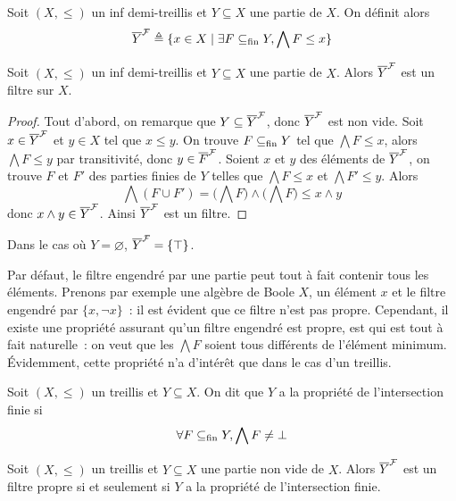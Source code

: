 \begin{definition}
  Soit $(X,\leq)$ un inf demi-treillis et $Y\subseteq X$ une partie de $X$. On 
  définit alors
  \[\overline{Y}^{\mathcal F} \triangleq \{x\in X \mid \exists F\subseteq_{\mathrm{fin}} Y, \bigwedge F \leq x\}\]
\end{definition}

\begin{proposition}
  Soit $(X,\leq)$ un inf demi-treillis et $Y\subseteq X$ une partie de $X$.
  Alors $\overline{Y}^{\mathcal F}$ est un filtre sur $X$.
\end{proposition}

\begin{proof}
  Tout d'abord, on remarque que $Y\subseteq \overline{Y}^{\mathcal F}$, donc $\overline{Y}^{\mathcal F}$ est
  non vide. Soit $x\in \overline{Y}^{\mathcal F}$ et $y\in X$ tel que $x\leq y$. On trouve
  $F\subseteq_{\mathrm{fin}} Y$ tel que $\bigwedge F\leq x$, alors $\bigwedge F \leq y$ par
  transitivité, donc $y\in \overline{F}^{\mathcal F}$. Soient $x$ et $y$ des éléments de
  $\overline{Y}^{\mathcal F}$, on trouve $F$ et $F'$ des parties finies de $Y$ telles que
  $\bigwedge F \leq x$ et $\bigwedge F' \leq y$. Alors
  \[\bigwedge (F\cup F') = \Bigg(\bigwedge F\Bigg)\land\Bigg(\bigwedge F\Bigg)
  \leq x\land y\]
  donc $x\land y \in \overline{Y}^{\mathcal F}$. Ainsi $\overline{Y}^{\mathcal F}$ est un filtre.
\end{proof}

\begin{remark}
  Dans le cas où $Y = \varnothing$, $\overline{Y}^{\mathcal F} = \{\top\}$.
\end{remark}

Par défaut, le filtre engendré par une partie peut tout à fait contenir tous
les éléments. Prenons par exemple une algèbre de Boole $X$, un élément $x$ et le
filtre engendré par $\{x,\lnot x\}$~: il est évident que ce filtre n'est pas
propre. Cependant, il existe une propriété assurant qu'un filtre engendré est
propre, est qui est tout à fait naturelle~: on veut que les $\bigwedge F$ soient
tous différents de l'élément minimum. \'Evidemment, cette propriété n'a d'intérêt
que dans le cas d'un treillis.

\begin{definition}
  Soit $(X,\leq)$ un treillis et $Y\subseteq X$. On dit que $Y$ a la propriété
  de l'intersection finie si
  \[\forall F\subseteq_{\mathrm{fin}} Y, \bigwedge F\neq \bot\]
\end{definition}

\begin{proposition}
  Soit $(X,\leq)$ un treillis et $Y\subseteq X$ une partie non vide de $X$.
  Alors $\overline{Y}^{\mathcal F}$ est un filtre propre si et seulement si $Y$ a la propriété
  de l'intersection finie.
\end{proposition}

